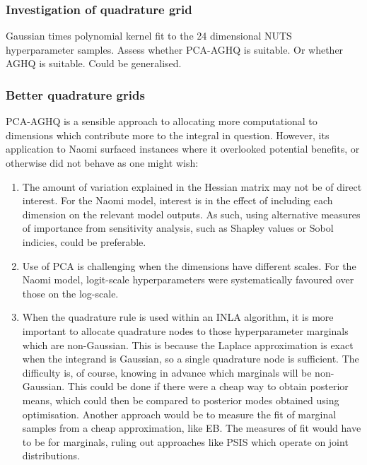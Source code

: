 \documentclass[a4paper, nobind]{templates/ociamthesis}
\providecommand{\tightlist}{%
  \setlength{\itemsep}{0pt}\setlength{\parskip}{0pt}}
\begin{document}
\hypertarget{investigation-of-quadrature-grid}{%
\subsubsection{Investigation of quadrature grid}\label{investigation-of-quadrature-grid}}

Gaussian times polynomial kernel fit to the 24 dimensional NUTS hyperparameter samples.
Assess whether PCA-AGHQ is suitable.
Or whether AGHQ is suitable.
Could be generalised.

\hypertarget{better-quadrature-grids}{%
\subsubsection{Better quadrature grids}\label{better-quadrature-grids}}

PCA-AGHQ is a sensible approach to allocating more computational to dimensions which contribute more to the integral in question.
However, its application to Naomi surfaced instances where it overlooked potential benefits, or otherwise did not behave as one might wish:

\begin{enumerate}
\def\labelenumi{\arabic{enumi}.}
\tightlist
\item
  The amount of variation explained in the Hessian matrix may not be of direct interest.
  For the Naomi model, interest is in the effect of including each dimension on the relevant model outputs.
  As such, using alternative measures of importance from sensitivity analysis, such as Shapley values \autocite{shapley1953value} or Sobol indicies, could be preferable.
\item
  Use of PCA is challenging when the dimensions have different scales.
  For the Naomi model, logit-scale hyperparameters were systematically favoured over those on the log-scale.
\item
  When the quadrature rule is used within an INLA algorithm, it is more important to allocate quadrature nodes to those hyperparameter marginals which are non-Gaussian.
  This is because the Laplace approximation is exact when the integrand is Gaussian, so a single quadrature node is sufficient.
  The difficulty is, of course, knowing in advance which marginals will be non-Gaussian.
  This could be done if there were a cheap way to obtain posterior means, which could then be compared to posterior modes obtained using optimisation.
  Another approach would be to measure the fit of marginal samples from a cheap approximation, like EB.
  The measures of fit would have to be for marginals, ruling out approaches like PSIS \autocite{yao2018yes} which operate on joint distributions.
\end{enumerate}
\end{document}
